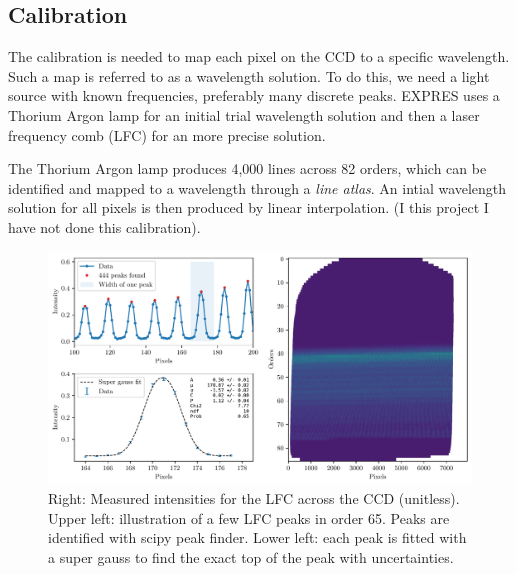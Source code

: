 \subsection{Calibration} 

    The calibration is needed to map each pixel on the CCD to a specific wavelength. Such a map is referred to as a wavelength solution. To do this, we need a light source with known frequencies, preferably many discrete peaks. EXPRES uses a Thorium Argon lamp for an initial trial wavelength solution and then a laser frequency comb (LFC) for an more precise solution.
    
    The Thorium Argon lamp produces 4,000 lines across 82 orders, which can be identified and mapped to a wavelength through a \emph{line atlas}. An intial wavelength solution for all pixels is then produced by linear interpolation. (I this project I have not done this calibration).


    \begin{figure}%
        \begin{wide}  
            \includegraphics[width=\textwidth]{figures/LFC_peak_fitting_overview.pdf}
            \caption{Right: Measured intensities for the LFC across the CCD (unitless). Upper left: illustration of a few LFC peaks in order 65. Peaks are identified with scipy peak finder. Lower left: each peak is fitted with a super gauss to find the exact top of the peak with uncertainties.}
            \label{fig:LFC_CCD}
        \end{wide}
    \end{figure}
    


